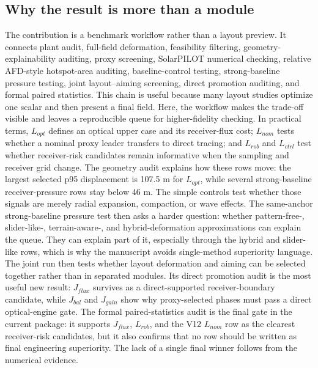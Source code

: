 \documentclass[final,3p,times]{elsarticle}
\begin{document}
\subsection{Why the result is more than a module}
The contribution is a benchmark workflow rather than a layout preview. It connects plant audit, full-field deformation, feasibility filtering, geometry-explainability auditing, proxy screening, SolarPILOT numerical checking, relative AFD-style hotspot-area auditing, baseline-control testing, strong-baseline pressure testing, joint layout--aiming screening, direct promotion auditing, and formal paired statistics. This chain is useful because many layout studies optimize one scalar and then present a final field. Here, the workflow makes the trade-off visible and leaves a reproducible queue for higher-fidelity checking. In practical terms, $L_{opt}$ defines an optical upper case and its receiver-flux cost; $L_{nom}$ tests whether a nominal proxy leader transfers to direct tracing; and $L_{rob}$ and $L_{ctrl}$ test whether receiver-risk candidates remain informative when the sampling and receiver grid change. The geometry audit explains how these rows move: the largest selected p95 displacement is 107.5 m for $L_{opt}$, while several strong-baseline receiver-pressure rows stay below 46 m. The simple controls test whether those signals are merely radial expansion, compaction, or wave effects. The same-anchor strong-baseline pressure test then asks a harder question: whether pattern-free-, slider-like-, terrain-aware-, and hybrid-deformation approximations can explain the queue. They can explain part of it, especially through the hybrid and slider-like rows, which is why the manuscript avoids single-method superiority language. The joint run then tests whether layout deformation and aiming can be selected together rather than in separated modules. Its direct promotion audit is the most useful new result: $J_{flux}$ survives as a direct-supported receiver-boundary candidate, while $J_{bal}$ and $J_{gain}$ show why proxy-selected phases must pass a direct optical-engine gate. The formal paired-statistics audit is the final gate in the current package: it supports $J_{flux}$, $L_{rob}$, and the V12 $L_{nom}$ row as the clearest receiver-risk candidates, but it also confirms that no row should be written as final engineering superiority. The lack of a single final winner follows from the numerical evidence.
\end{document}
